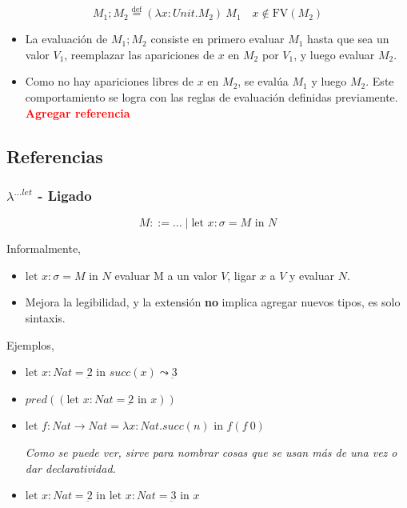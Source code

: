 \documentclass{report}
\theoremstyle{definition} %
\newcommand{\todo}[1]{{\textcolor{red}{\textbf{#1}}}}
\newcommand{\eqdef}{\overset{\text{def}}{=}}
\newcommand{\tfunc}[2]{#1 \to #2}
\newcommand{\abs}[3]{\lambda #1 : #2 . #3}
\newcommand{\app}[2]{#1 \ #2} %
\newcommand{\fv}[1]{\text{FV}(#1)} %
\newcommand{\suc}[1]{succ(#1)}
\newcommand{\pred}[1]{pred(#1)}
\newcommand{\num}[1]{\underbar{#1}} %
\newcommand{\seq}[2]{#1;#2}
\newcommand{\lambdalet}{\lambda^{\dots let}}
\newcommand{\letin}[4]{\text{let } #1 : #2 = #3 \text{ in } #4}
\newcommand{\evalsto}{\leadsto}
\begin{document}
\[
    \seq{M_1}{M_2} \eqdef \app{(\abs{x}{Unit}{M_2})}{M_1} \quad x\notin \fv{M_2}
\]

\begin{itemize}
    \item La evaluación de $M_1; M_2$ consiste en primero evaluar $M_1$ hasta
    que sea un valor $V_1$, reemplazar las apariciones de $x$ en $M_2$ por
    $V_1$, y luego evaluar $M_2$.
    \item Como no hay apariciones libres de $x$ en $M_2$, se evalúa $M_1$ y
    luego $M_2$. Este comportamiento se logra con las reglas de evaluación
    definidas previamente. \todo{Agregar referencia}
\end{itemize}

\subsection{Referencias}

\subsubsection{$\lambdalet$ - Ligado}

\[
    M ::= \dots \mid \letin{x}{\sigma}{M}{N}
\]

Informalmente,

\begin{itemize}
    \item $\letin{x}{\sigma}{M}{N}$ evaluar M a un valor $V$, ligar $x$ a $V$ y
    evaluar $N$.
    \item Mejora la legibilidad, y la extensión \textbf{no} implica agregar
    nuevos tipos, es solo sintaxis.
\end{itemize}

Ejemplos,

\begin{itemize}
    \item $\letin{x}{Nat}{\num{2}}{\suc{x}} \evalsto \num{3}$
    \item $\pred{(\letin{x}{Nat}{\num{2}}{x})}$
    \item \(
        \letin
            {f}
            {\tfunc{Nat}{Nat}}
            {\abs{x}{Nat}{\suc{n}}}
            {f(\app{f}{0})}
    \)

    \textit{Como se puede ver, sirve para nombrar cosas que se usan más de una vez o dar declaratividad.}
    \item \(
        \letin
            {x}
            {Nat}
            {\num{2}}
            {\letin{x}{Nat}{\num{3}}{x}}
    \)
\end{itemize}
\end{document}
